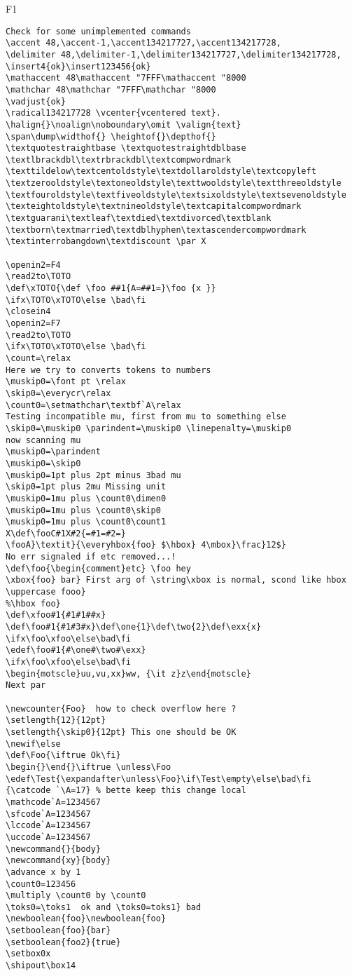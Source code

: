 \documentclass{article}
\begin{document}
\begin{filecontents+}{F1}
\begin{Verbatim}
Check for some unimplemented commands
\accent 48,\accent-1,\accent134217727,\accent134217728, 
\delimiter 48,\delimiter-1,\delimiter134217727,\delimiter134217728, 
\insert4{ok}\insert123456{ok}
\mathaccent 48\mathaccent "7FFF\mathaccent "8000
\mathchar 48\mathchar "7FFF\mathchar "8000
\vadjust{ok}
\radical134217728 \vcenter{vcentered text}.
\halign{}\noalign\noboundary\omit \valign{text}
\span\dump\widthof{} \heightof{}\depthof{}
\textquotestraightbase \textquotestraightdblbase
\textlbrackdbl\textrbrackdbl\textcompwordmark
\texttildelow\textcentoldstyle\textdollaroldstyle\textcopyleft
\textzerooldstyle\textoneoldstyle\texttwooldstyle\textthreeoldstyle
\textfouroldstyle\textfiveoldstyle\textsixoldstyle\textsevenoldstyle
\texteightoldstyle\textnineoldstyle\textcapitalcompwordmark
\textguarani\textleaf\textdied\textdivorced\textblank
\textborn\textmarried\textdblhyphen\textascendercompwordmark
\textinterrobangdown\textdiscount \par X
 
\openin2=F4
\read2to\TOTO
\def\xTOTO{\def \foo ##1{A=##1=}\foo {x }}
\ifx\TOTO\xTOTO\else \bad\fi
\closein4
\openin2=F7
\read2to\TOTO
\ifx\TOTO\xTOTO\else \bad\fi
\count=\relax
Here we try to converts tokens to numbers
\muskip0=\font pt \relax
\skip0=\everycr\relax 
\count0=\setmathchar\textbf`A\relax
Testing incompatible mu, first from mu to something else
\skip0=\muskip0 \parindent=\muskip0 \linepenalty=\muskip0
now scanning mu
\muskip0=\parindent 
\muskip0=\skip0 
\muskip0=1pt plus 2pt minus 3bad mu
\skip0=1pt plus 2mu Missing unit
\muskip0=1mu plus \count0\dimen0
\muskip0=1mu plus \count0\skip0
\muskip0=1mu plus \count0\count1
X\def\fooC#1X#2{=#1=#2=}
\fooA}\textit}{\everyhbox{foo} $\hbox} 4\mbox}\frac}12$}
No err signaled if etc removed...!
\def\foo{\begin{comment}etc} \foo hey
\xbox{foo} bar} First arg of \string\xbox is normal, scond like hbox 
\uppercase fooo}
%\hbox foo}
\def\xfoo#1{#1#1##x}
\def\foo#1{#1#3#x}\def\one{1}\def\two{2}\def\exx{x}
\ifx\foo\xfoo\else\bad\fi
\edef\foo#1{#\one#\two#\exx}
\ifx\foo\xfoo\else\bad\fi
\begin{motscle}uu,vu,xx}ww, {\it z}z\end{motscle}
Next par

\newcounter{Foo}  how to check overflow here ?
\setlength{12}{12pt}
\setlength{\skip0}{12pt} This one should be OK
\newif\else
\def\Foo{\iftrue Ok\fi}
\begin{}\end{}\iftrue \unless\Foo
\edef\Test{\expandafter\unless\Foo}\if\Test\empty\else\bad\fi
{\catcode `\A=17} % bette keep this change local
\mathcode`A=1234567
\sfcode`A=1234567
\lccode`A=1234567
\uccode`A=1234567
\newcommand{}{body}
\newcommand{xy}{body}
\advance x by 1
\count0=123456
\multiply \count0 by \count0
\toks0=\toks1  ok and \toks0=toks1} bad
\newboolean{foo}\newboolean{foo}
\setboolean{foo}{bar}
\setboolean{foo2}{true}
\setbox0x
\shipout\box14


\end{Verbatim}
\end{filecontents+}
\end{document}
